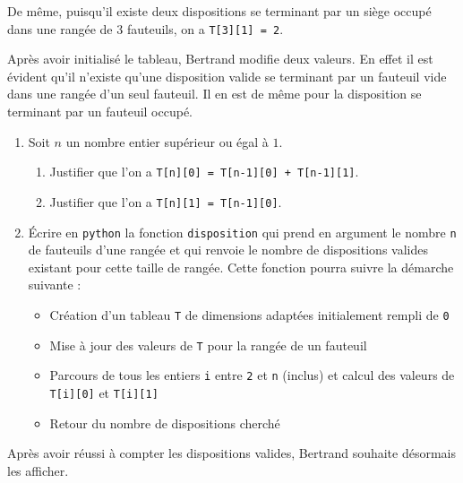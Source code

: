 \documentclass[a4paper, 11pt]{article}
\begin{document}
De même, puisqu'il existe deux dispositions se terminant par un siège occupé dans une rangée de $3$ fauteuils, on a \texttt{T[3][1] = 2}.

Après avoir initialisé le tableau, Bertrand modifie deux valeurs. En effet il est évident qu'il n'existe qu'une disposition valide se terminant par un fauteuil vide dans une rangée d'un seul fauteuil.
Il en est de même pour la disposition se terminant par un fauteuil occupé. 

\begin{enumerate}[resume*]
	\item Soit $n$ un nombre entier supérieur ou égal à $1$.
	\begin{enumerate}
			\item Justifier que l'on a \texttt{T[n][0] = T[n-1][0] + T[n-1][1]}.
			\item Justifier que l'on a \texttt{T[n][1] = T[n-1][0]}.
	\end{enumerate}
	\item \'Ecrire en \texttt{python} la fonction \texttt{disposition} qui prend en argument le nombre \texttt{n} de fauteuils d'une rangée et qui renvoie le nombre de dispositions valides existant pour cette taille de rangée.
	Cette fonction pourra suivre la démarche suivante :
	\begin{itemize}
		\item Création d'un tableau \texttt{T} de dimensions adaptées initialement rempli de \texttt{0}
		\item Mise à jour des valeurs de \texttt{T} pour la rangée de un fauteuil
		\item Parcours de tous les entiers \texttt{i} entre \texttt{2} et \texttt{n} (inclus) et calcul des valeurs de \texttt{T[i][0]} et \texttt{T[i][1]}
		\item Retour du nombre de dispositions cherché 
	\end{itemize}
\end{enumerate}


Après avoir réussi à compter les dispositions valides, Bertrand souhaite désormais les afficher.
\end{document}
